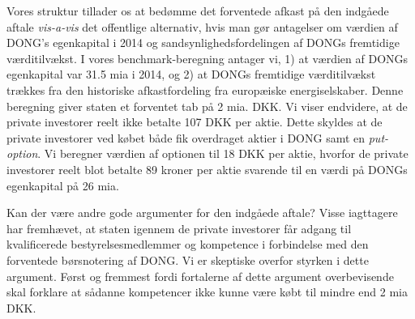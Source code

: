 \documentclass{article}
\begin{document}
Vores struktur tillader os at bedømme det forventede afkast på den indgåede aftale \emph{vis-a-vis} det offentlige alternativ, hvis man gør antagelser om værdien af DONG's egenkapital i 2014 og sandsynlighedsfordelingen af DONGs fremtidige værditilvækst. I vores benchmark-beregning antager vi, 1) at værdien af DONGs egenkapital var 31.5 mia i 2014, og 2) at DONGs fremtidige værditilvækst trækkes fra den historiske afkastfordeling fra europæiske energiselskaber. Denne beregning giver staten et forventet tab på 2 mia. DKK. Vi viser endvidere, at de private investorer reelt ikke betalte 107 DKK per aktie. Dette skyldes at de private investorer ved købet både fik overdraget  aktier i DONG samt en \emph{put-option}. Vi beregner værdien af optionen til 18 DKK per aktie, hvorfor de private investorer reelt blot betalte 89 kroner per aktie svarende til en værdi på DONGs egenkapital på 26 mia. %


Kan der være andre gode argumenter for den indgåede aftale? Visse iagttagere har fremhævet, at staten igennem de private investorer får adgang til kvalificerede bestyrelsesmedlemmer og kompetence i forbindelse med den forventede børsnotering af DONG. Vi er skeptiske overfor styrken i dette argument. Først og fremmest fordi fortalerne af dette argument overbevisende skal forklare at sådanne kompetencer ikke kunne være købt til mindre end 2 mia DKK.
\end{document}
